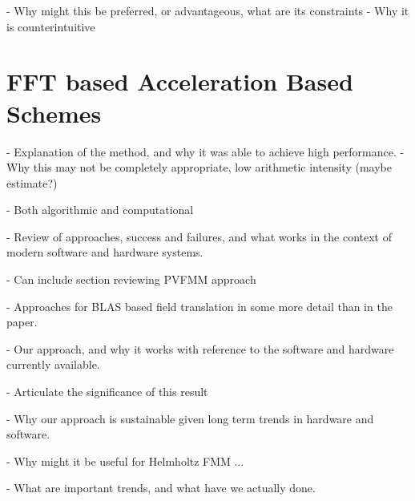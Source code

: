 - Why might this be preferred, or advantageous, what are its constraints
- Why it is counterintuitive


\section{FFT based Acceleration Based Schemes}

- Explanation of the method, and why it was able to achieve high performance.
- Why this may not be completely appropriate, low arithmetic intensity (maybe estimate?)




- Both algorithmic and computational

- Review of approaches, success and failures, and what works in the context of modern software and hardware systems.

- Can include section reviewing PVFMM approach

- Approaches for BLAS based field translation in some more detail than in the paper.

- Our approach, and why it works with reference to the software and hardware currently available.

- Articulate the significance of this result

- Why our approach is sustainable given long term trends in hardware and software.

- Why might it be useful for Helmholtz FMM ...

- What are important trends, and what have we actually done.